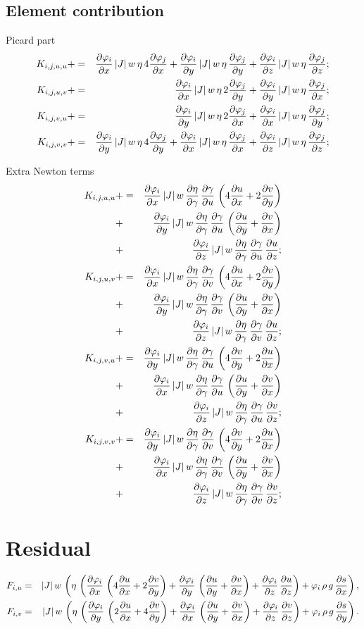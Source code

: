 \documentclass[draft]{article}
\begin{document}
\subsection{Element contribution}
\label{sec:element-matrix}


Picard part
\begin{eqnarray*}
 K_{i,j,u,u} &+=& \dphi{x}\,\jw\,\eta\,4\dphi[j]{x} + \dphi{y}\,\jw\,\eta\,\dphi[j]{y} + \dphi{z}\,\jw\,\eta\,\dphi[j]{z};\\
  K_{i,j,u,v} &+=& \dphi{x}\,\jw\,\eta\,2\dphi[j]{y} + \dphi{y}\,\jw\,\eta\,\dphi[j]{x};\\
  K_{i,j,v,u} &+=& \dphi{y}\,\jw\,\eta\,2\dphi[j]{x} + \dphi{x}\,\jw\,\eta\,\dphi[j]{y};\\
  K_{i,j,v,v} &+=& \dphi{y}\,\jw\,\eta\,4\dphi[j]{y} + \dphi{x}\,\jw\,\eta\,\dphi[j]{x} + \dphi{z}\,\jw\,\eta\,\dphi[j]{z};\\
\end{eqnarray*}

Extra Newton terms
\begin{eqnarray*}
  K_{i,j,u,u} &+=& \dphi{x}\,\jw\,\deta\,\dgdu\,\p{4\dux+2\dvy}\\
  &+& \dphi{y}\,\jw\,\deta\,\dgdu\,\p{\duy+\dvx}\\
  &+& \dphi{z}\,\jw\,\deta\,\dgdu\,\duz;\\
  K_{i,j,u,v} &+=& \dphi{x}\,\jw\,\deta\,\dgdv\,\p{4\dux+2\dvy}\\
  &+& \dphi{y}\,\jw\,\deta\,\dgdv\,\p{\duy+\dvx}\\
  &+& \dphi{z}\,\jw\,\deta\,\dgdv\,\duz;\\
  K_{i,j,v,u} &+=& \dphi{y}\,\jw\,\deta\,\dgdu\,\p{4\dvy+2\dux}\\
  &+& \dphi{x}\,\jw\,\deta\,\dgdu\,\p{\duy+\dvx}\\
  &+& \dphi{z}\,\jw\,\deta\,\dgdu\,\dvz;\\
  K_{i,j,v,v} &+=& \dphi{y}\,\jw\,\deta\,\dgdv\,\p{4\dvy+2\dux}\\
  &+& \dphi{x}\,\jw\,\deta\,\dgdv\,\p{\duy+\dvx}\\
  &+& \dphi{z}\,\jw\,\deta\,\dgdv\,\dvz;\\
\end{eqnarray*}

\section{Residual}
\label{sec:residual}

\begin{eqnarray}
  \label{eq:4}
  F_{i,u} &=& \jw\, \left(\eta\, \left(\dphi{x}\, \p{4\dux + 2\dvy} + \dphi{y}\,
      \p{\duy + \dvx} + \dphi{z}\, \duz \right) + \varphi_{i}\, \rho\, g\, \diff{s}{x}\right),\\
  F_{i,v} &=& \jw\, \left(\eta\, \left(\dphi{y}\, \p{2\dux + 4\dvy} + \dphi{x}\, \p{\duy + \dvx} +
      \dphi{z}\, \dvz \right) + \varphi_{i}\, \rho\, g\, \diff{s}{y}\right).
\end{eqnarray}
\end{document}
